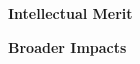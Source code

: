 \begin{center}
    \textbf{Intellectual Merit}
\end{center}


\begin{center}
    \textbf{Broader Impacts}
\end{center}

